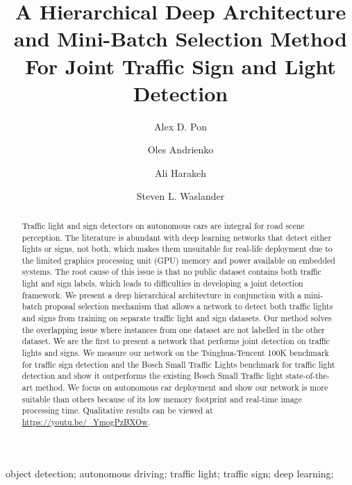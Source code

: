 \documentclass[10pt, conference, compsocconf]{IEEEtran}
\begin{document}
\title{A Hierarchical Deep Architecture and Mini-Batch Selection Method For Joint Traffic Sign and Light Detection}


\author[]{Alex D. Pon}
\author[]{Oles Andrienko}
\author[]{Ali Harakeh}
\author[]{Steven L. Waslander}


\maketitle

\begin{abstract}

Traffic light and sign detectors on autonomous cars are integral for road scene perception. The literature is abundant with deep learning networks that detect either lights or signs, not both, which makes them unsuitable for real-life deployment due to the limited graphics processing unit (GPU) memory and power available on embedded systems. The root cause of this issue is that no public dataset contains both traffic light and sign labels, which leads to difficulties in developing a joint detection framework. We present a deep hierarchical architecture in conjunction with a mini-batch proposal selection mechanism that allows a network to detect both traffic lights and signs from training on separate traffic light and sign datasets. Our method solves the overlapping issue where instances from one dataset are not labelled in the other dataset. We are the first to present a network that performs joint detection on traffic lights and signs. We measure our network on the Tsinghua-Tencent 100K benchmark for traffic sign detection and the Bosch Small Traffic Lights benchmark for traffic light detection and show it outperforms the existing Bosch Small Traffic light state-of-the-art method. We focus on autonomous car deployment and show our network is more suitable than others because of its low memory footprint and real-time image processing time. Qualitative results can be viewed at \href{https://youtu.be/_YmogPzBXOw}{https://youtu.be/\_YmogPzBXOw}.
\end{abstract}

\begin{IEEEkeywords}
object detection; autonomous driving; traffic light; traffic sign; deep learning;
\end{IEEEkeywords}
\end{document}
